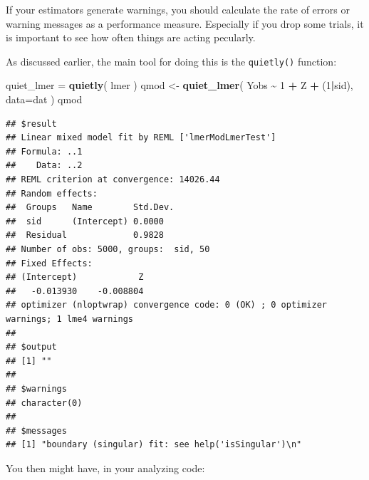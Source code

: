 \documentclass[
]{book}
\newenvironment{Shaded}{\begin{snugshade}}{\end{snugshade}}
\newcommand{\AttributeTok}[1]{\textcolor[rgb]{0.13,0.29,0.53}{#1}}
\newcommand{\DecValTok}[1]{\textcolor[rgb]{0.00,0.00,0.81}{#1}}
\newcommand{\FunctionTok}[1]{\textcolor[rgb]{0.13,0.29,0.53}{\textbf{#1}}}
\newcommand{\NormalTok}[1]{#1}
\newcommand{\OtherTok}[1]{\textcolor[rgb]{0.56,0.35,0.01}{#1}}
\newcommand{\SpecialCharTok}[1]{\textcolor[rgb]{0.81,0.36,0.00}{\textbf{#1}}}
\begin{document}
If your estimators generate warnings, you should calculate the rate of errors or warning messages as a performance measure.
Especially if you drop some trials, it is important to see how often things are acting pecularly.

As discussed earlier, the main tool for doing this is the \texttt{quietly()} function:

\begin{Shaded}
\begin{Highlighting}[]
\NormalTok{quiet\_lmer }\OtherTok{=} \FunctionTok{quietly}\NormalTok{( lmer )}
\NormalTok{qmod }\OtherTok{\textless{}{-}} \FunctionTok{quiet\_lmer}\NormalTok{( Yobs }\SpecialCharTok{\textasciitilde{}} \DecValTok{1} \SpecialCharTok{+}\NormalTok{ Z }\SpecialCharTok{+}\NormalTok{ (}\DecValTok{1}\SpecialCharTok{|}\NormalTok{sid), }\AttributeTok{data=}\NormalTok{dat )}
\NormalTok{qmod}
\end{Highlighting}
\end{Shaded}

\begin{verbatim}
## $result
## Linear mixed model fit by REML ['lmerModLmerTest']
## Formula: ..1
##    Data: ..2
## REML criterion at convergence: 14026.44
## Random effects:
##  Groups   Name        Std.Dev.
##  sid      (Intercept) 0.0000  
##  Residual             0.9828  
## Number of obs: 5000, groups:  sid, 50
## Fixed Effects:
## (Intercept)            Z  
##   -0.013930    -0.008804  
## optimizer (nloptwrap) convergence code: 0 (OK) ; 0 optimizer warnings; 1 lme4 warnings 
## 
## $output
## [1] ""
## 
## $warnings
## character(0)
## 
## $messages
## [1] "boundary (singular) fit: see help('isSingular')\n"
\end{verbatim}

You then might have, in your analyzing code:
\end{document}
